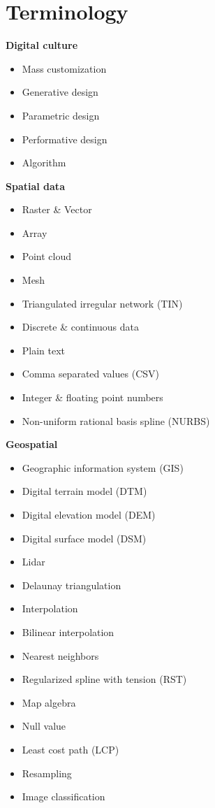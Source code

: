 \documentclass[11pt,article,oneside]{memoir}
\begin{document}
\section{Terminology}
\begin{multicols}{2}
\raggedright
\small
%
\textbf{Digital culture}
\begin{itemize}
\item Mass customization
\item Generative design
\item Parametric design
\item Performative design
\item Algorithm
\end{itemize}

\textbf{Spatial data}
\begin{itemize}
\item Raster \& Vector
\item Array
\item Point cloud
\item Mesh
\item Triangulated irregular network (TIN)
\item Discrete \& continuous data
\item Plain text
\item Comma separated values (CSV)
\item Integer \& floating point numbers
\item Non-uniform rational basis spline (NURBS)
\end{itemize}

\textbf{Geospatial}
\begin{itemize}
\item Geographic information system (GIS)
\item Digital terrain model (DTM)
\item Digital elevation model (DEM)
\item Digital surface model (DSM)
\item Lidar
\item Delaunay triangulation
\item Interpolation
\item Bilinear interpolation
\item Nearest neighbors
\item Regularized spline with tension (RST)
\item Map algebra
\item Null value
\item Least cost path (LCP)
\item Resampling
\item Image classification
\end{itemize}


\end{multicols}
\end{document}
